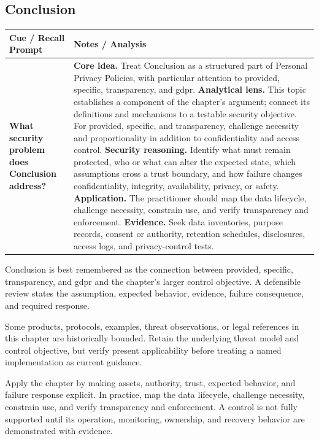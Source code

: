 \documentclass[11pt]{article}
\newcommand{\CornellHeader}{%
\rowcolor{Navy}\color{white}\bfseries Cue / Recall Prompt & \color{white}\bfseries Notes / Analysis\\\hline}
\newcommand{\CornellRow}[2]{%
\cellcolor{CueGray}\RaggedRight\textbf{#1} & \RaggedRight #2\\\hline}
\begin{document}
\subsection*{Conclusion}
\begin{longtable}{>{\RaggedRight\arraybackslash}p{}|>{\RaggedRight\arraybackslash}p{}}
\CornellHeader
\CornellRow{What security problem does Conclusion address?}{\textbf{Core idea.} Treat Conclusion as a structured part of Personal Privacy Policies, with particular attention to provided, specific, transparency, and gdpr. \textbf{Analytical lens.} This topic establishes a component of the chapter's argument; connect its definitions and mechanisms to a testable security objective. For provided, specific, and transparency, challenge necessity and proportionality in addition to confidentiality and access control. \textbf{Security reasoning.} Identify what must remain protected, who or what can alter the expected state, which assumptions cross a trust boundary, and how failure changes confidentiality, integrity, availability, privacy, or safety. \textbf{Application.} The practitioner should map the data lifecycle, challenge necessity, constrain use, and verify transparency and enforcement. \textbf{Evidence.} Seek data inventories, purpose records, consent or authority, retention schedules, disclosures, access logs, and privacy-control tests.}
\end{longtable}
\begin{topicsummary}
Conclusion is best remembered as the connection between provided, specific, transparency, and gdpr and the chapter's larger control objective. A defensible review states the assumption, expected behavior, evidence, failure consequence, and required response.
\end{topicsummary}
\begin{historybox}
Some products, protocols, examples, threat observations, or legal references in this chapter are historically bounded. Retain the underlying threat model and control objective, but verify present applicability before treating a named implementation as current guidance.
\end{historybox}
\begin{defensebox}
Apply the chapter by making assets, authority, trust, expected behavior, and failure response explicit. In practice, map the data lifecycle, challenge necessity, constrain use, and verify transparency and enforcement. A control is not fully supported until its operation, monitoring, ownership, and recovery behavior are demonstrated with evidence.
\end{defensebox}
\end{document}
